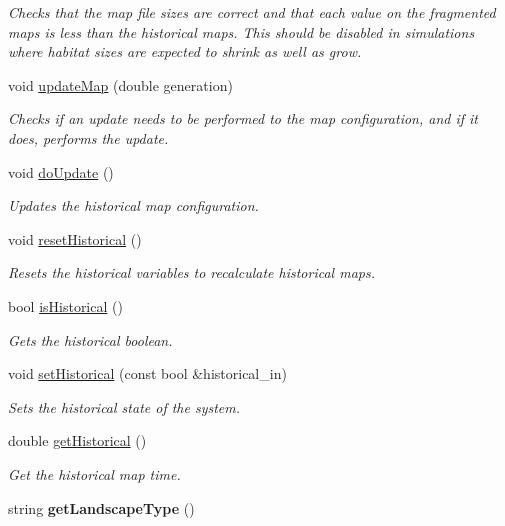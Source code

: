 \begin{DoxyCompactItemize}
\begin{DoxyCompactList}\small\item\em Checks that the map file sizes are correct and that each value on the fragmented maps is less than the historical maps. This should be disabled in simulations where habitat sizes are expected to shrink as well as grow. \end{DoxyCompactList}\item 
void \hyperlink{class_landscape_aa96c5208ad89b2e620b52f80b0937dff}{update\+Map} (double generation)
\begin{DoxyCompactList}\small\item\em Checks if an update needs to be performed to the map configuration, and if it does, performs the update. \end{DoxyCompactList}\item 
void \hyperlink{class_landscape_a1669ae6563ef5ed11ce1da30fb28214b}{do\+Update} ()
\begin{DoxyCompactList}\small\item\em Updates the historical map configuration. \end{DoxyCompactList}\item 
void \hyperlink{class_landscape_a03e35a3a42e40a683be01e75413d30d2}{reset\+Historical} ()
\begin{DoxyCompactList}\small\item\em Resets the historical variables to recalculate historical maps. \end{DoxyCompactList}\item 
bool \hyperlink{class_landscape_ab302f8a4ae779d20df94cb2525187cac}{is\+Historical} ()
\begin{DoxyCompactList}\small\item\em Gets the historical boolean. \end{DoxyCompactList}\item 
void \hyperlink{class_landscape_a7b1c5459e1ecf8d11c1dd12299a53c61}{set\+Historical} (const bool \&historical\+\_\+in)
\begin{DoxyCompactList}\small\item\em Sets the historical state of the system. \end{DoxyCompactList}\item 
double \hyperlink{class_landscape_a6b15e6748d7d776deaa489e618750983}{get\+Historical} ()
\begin{DoxyCompactList}\small\item\em Get the historical map time. \end{DoxyCompactList}\item 
string {\bfseries get\+Landscape\+Type} ()\hypertarget{class_landscape_a5dec397270e8278478f807660e43d565}{}\label{class_landscape_a5dec397270e8278478f807660e43d565}


\end{DoxyCompactItemize}
